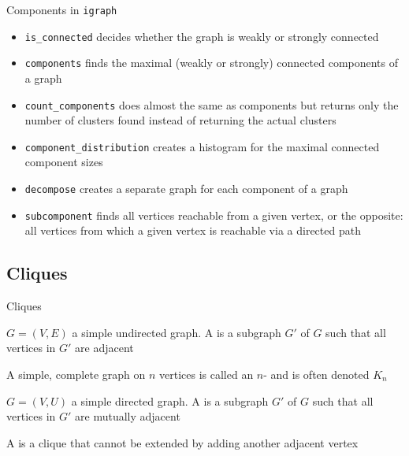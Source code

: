 \documentclass[aspectratio=169]{beamer}\usepackage[]{graphicx}\usepackage[]{xcolor}
\begin{document}
\begin{frame}{Components in {\tt igraph}}
\begin{itemize}
	\item {\tt is\_connected} decides whether the graph is weakly or strongly connected
	\item {\tt components} finds the maximal (weakly or strongly) connected components of a graph
	\item {\tt count\_components} does almost the same as components but returns only the number of clusters found instead of returning the actual clusters
	\item {\tt component\_distribution} creates a histogram for the maximal connected component sizes
	\item {\tt decompose} creates a separate graph for each component of a graph
	\item {\tt subcomponent} finds all vertices reachable from a given vertex, or the opposite: all vertices from which a given vertex is reachable via a directed path
\end{itemize}
\end{frame}
	
\subsection{Cliques}


\begin{frame}{Cliques}
	\begin{definition}
		$G=(V,E)$ a simple undirected graph. A  is a subgraph $G'$ of $G$ such that all vertices in $G'$ are adjacent
	\end{definition}
	\begin{definition}[$n$-clique]
		A simple, complete graph on $n$ vertices is called an $n$- and is often denoted $K_n$
	\end{definition}
	\begin{definition}
		$G=(V,U)$ a simple directed graph. A  is a subgraph $G'$ of $G$ such that all vertices in $G'$ are mutually adjacent
	\end{definition}
	\begin{definition}
		A  is a clique that cannot be extended by adding another adjacent vertex
	\end{definition}
\end{frame}
\end{document}
